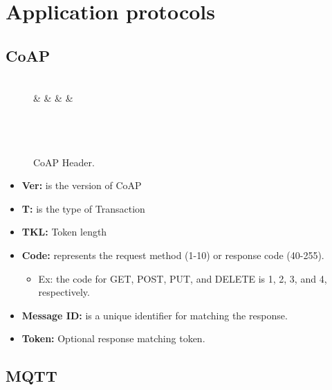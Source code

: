 \section{Application protocols}

\subsection{CoAP}

\begin{figure}[h]
	\footnotesize
	\centering
	\begin{bytefield}[bitwidth=1em]{32}
		                                                     \\
		 &  &  &  & \\
		                                                        \\
		                                                      \\
		                                       \\
	\end{bytefield}
\caption{CoAP Header.}\label{fig:2}
\end{figure}


\begin{itemize}
	\item \textbf{Ver:}  is the version of CoAP
	\item \textbf{T:}  is the type of Transaction
	\item \textbf{TKL:}  Token length
	\item \textbf{Code:} represents the request method (1-10) or response code (40-255).
		\begin{itemize}
			\item Ex: the code for GET, POST, PUT, and DELETE is 1, 2, 3, and 4, respectively.
		\end{itemize}
	\item \textbf{Message ID:} is a unique identifier for matching the response.
	\item \textbf{Token:}  Optional response matching token.
\end{itemize}
	
\subsection{MQTT}

